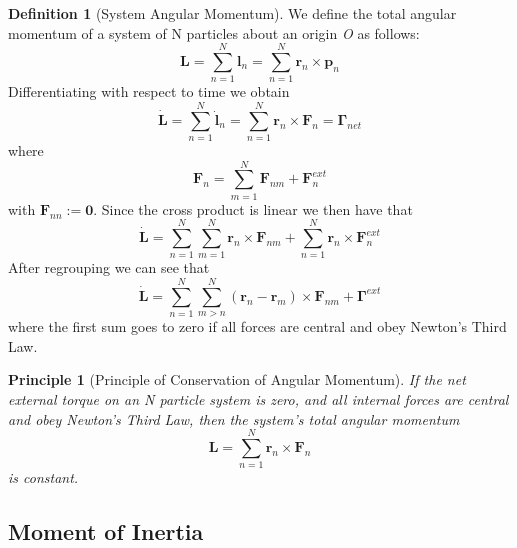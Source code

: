 \documentclass[12pt]{article}
\newtheorem{pri}[thm]{Principle}
\theoremstyle{definition}
\newtheorem{defn}[thm]{Definition}
\theoremstyle{remark}
\numberwithin{equation}{section}
\newcommand\B[1]{\textbf{#1}}
\begin{document}
\begin{defn}[System Angular Momentum]
        We define the total angular momentum of a system of N particles about an origin \emph{O} as follows:
        \begin{equation}
                \B{L} = \sum\limits_{n=1}^N\B{l}_n = \sum\limits_{n=1}^N\B{r}_n\times \B{p}_n
        \end{equation}
        Differentiating with respect to time we obtain 
        \begin{equation}
                \dot{\B{L}} = \sum\limits_{n=1}^N\dot{\B{l}}_n = \sum\limits_{n=1}^N\B{r}_n\times \B{F}_n = \boldsymbol{\Gamma}_{net}
        \end{equation}
        where \begin{equation}
                \B{F}_n = \sum\limits_{m=1}^N\B{F}_{nm} + \B{F}^{ext}_n
        \end{equation}
        with $\B{F}_{nn} := \B{0}$. Since the cross product is linear we then have that \begin{equation}
                \dot{\B{L}}= \sum\limits_{n=1}^N\sum\limits_{m=1}^N\B{r}_n\times\B{F}_{nm} + \sum\limits_{n=1}^N\B{r}_n\times\B{F}^{ext}_n
        \end{equation}
        After regrouping we can see that \begin{equation}
                \dot{\B{L}}= \sum\limits_{n=1}^N\sum\limits_{m>n}^N(\B{r}_n-\B{r}_m)\times\B{F}_{nm} + \boldsymbol{\Gamma}^{ext}
        \end{equation}
        where the first sum goes to zero if all forces are central and obey Newton's Third Law.
\end{defn}

\vspace{15pt}


\begin{pri}[Principle of Conservation of Angular Momentum]
        If the net external torque on an N particle system is zero, and all internal forces are central and obey Newton's Third Law, then the system's total angular momentum \begin{equation}
                \B{L} = \sum\limits_{n=1}^N\B{r}_n\times \B{F}_n
        \end{equation}
        is constant.
\end{pri}

\vspace{15pt}


\subsection{Moment of Inertia}
\end{document}
